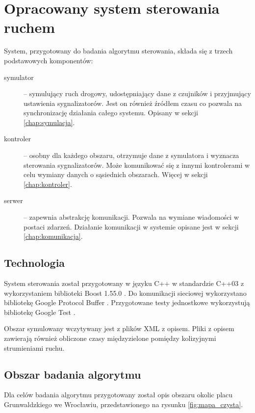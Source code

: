 \chapter{Opracowany system sterowania ruchem}
System, przygotowany do badania algorytmu sterowania, składa się z trzech podstawowych komponentów:
\begin{description}
	\item[symulator] --
		symulujący ruch drogowy, udostępniający dane z czujników i przyjmujący ustawienia sygnalizatorów.
		Jest on również źródłem czasu co pozwala na synchronizację działania całego systemu. Opisany w sekcji \ref{chap:symulacja}.
	\item[kontroler] --
		osobny dla każdego obszaru, otrzymuje dane z symulatora i wyznacza sterowania sygnalizatorów.
		Może komunikować się z innymi kontrolerami w celu wymiany danych o sąsiednich obszarach. Więcej w sekcji \ref{chap:kontroler}.
	\item[serwer] --
		zapewnia abstrakcję komunikacji. Pozwala na wymiane wiadomości w postaci zdarzeń.
		Działanie komunikacji w systemie opisane jest w sekcji \ref{chap:komunikacja}.
\end{description}

\section{Technologia}
System sterowania został przygotowany w języku C++ w standardzie C++03 z wykorzystaniem biblioteki Boost 1.55.0 \cite{boost}. Do komunikacji sieciowej wykorzystano bibliotekę Google Protocol Buffer \cite{protobuf}. Przygotowane testy jednostkowe wykorzystują bibliotekę Google Test \cite{gtest}.

Obszar symulowany wczytywany jest z plików XML z opisem. Pliki z opisem zawierają również obliczone czasy międzyzielone pomiędzy kolizyjnymi strumieniami ruchu.

\section{Obszar badania algorytmu}
Dla celów badania algorytmu przygotowany został opis obszaru okolic placu Grunwaldzkiego we Wrocławiu, przedstawionego na rysunku \ref{fig:mapa_czysta}.

